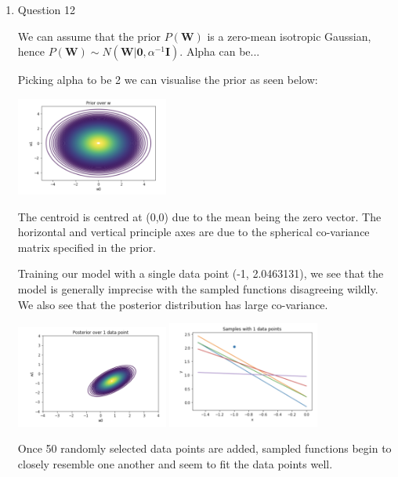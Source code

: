 \documentclass[13pt]{article}
\begin{document}
\begin{enumerate}
  \item{\large Question 12}
  
  \begin{enumerate}
      
      We can assume that the prior $P(\mathbf{W})$ is a zero-mean isotropic Gaussian, hence $P(\mathbf{W})\sim N(\mathbf{W}|\mathbf{0},\alpha^{-1}\mathbf{I})$. Alpha can be...
      
      Picking alpha to be 2 we can visualise the prior as seen below:
      
    \includegraphics[width=50mm,scale=0.5]{images/priorw.png}
      
      The centroid is centred at (0,0) due to the mean being the zero vector. The horizontal and vertical principle axes are due to the spherical co-variance matrix specified in the prior. 
     
      Training our model with a single data point (-1, 2.0463131), we see that the model is generally imprecise with the sampled functions disagreeing wildly. We also see that the posterior distribution has large co-variance.
      
      \includegraphics[width=50mm,scale=0.5]{images/post1.png}
      \includegraphics[width=50mm,scale=0.5]{images/sample1.png}
      
      Once 50 randomly selected data points are added, sampled functions begin to closely resemble one another and seem to fit the data points well.
      

\end{enumerate}
\end{enumerate}
\end{document}
